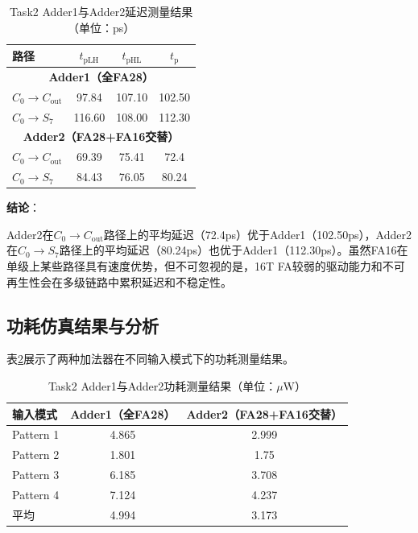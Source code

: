 \documentclass[UTF8,12pt,a4paper]{ctexart}
\begin{document}
\begin{table}[htbp]
    \centering
    \caption{Task2 Adder1与Adder2延迟测量结果（单位：ps）}
    \label{tab:task2_delay}
    \begin{tabular}{lccc}
    \toprule
    路径 & $t_{\text{pLH}}$ & $t_{\text{pHL}}$ & $t_{\text{p}}$ \\
    \midrule
    \multicolumn{4}{c}{\textbf{Adder1（全FA28）}} \\
    \midrule
    $C_0 \rightarrow C_{\text{out}}$ & 97.84 & 107.10 & 102.50 \\
    $C_0 \rightarrow S_7$ & 116.60 & 108.00 & 112.30 \\
    \midrule
    \multicolumn{4}{c}{\textbf{Adder2（FA28+FA16交替）}} \\
    \midrule
    $C_0 \rightarrow C_{\text{out}}$ & 69.39 & 75.41 & 72.4 \\
    $C_0 \rightarrow S_7$ & 84.43 & 76.05 & 80.24 \\
    \bottomrule
    \end{tabular}
\end{table}

\textbf{结论}：

Adder2在$C_0 \rightarrow C_{\text{out}}$路径上的平均延迟（72.4ps）优于Adder1（102.50ps），Adder2在$C_0 \rightarrow S_7$路径上的平均延迟（80.24ps）也优于Adder1（112.30ps）。虽然FA16在单级上某些路径具有速度优势，但不可忽视的是，16T FA较弱的驱动能力和不可再生性会在多级链路中累积延迟和不稳定性。

\subsection{功耗仿真结果与分析}

表\ref{tab:task2_power}展示了两种加法器在不同输入模式下的功耗测量结果。

\begin{table}[htbp]
    \centering
    \caption{Task2 Adder1与Adder2功耗测量结果（单位：$\mu$W）}
    \label{tab:task2_power}
    \begin{tabular}{lcc}
    \toprule
    输入模式 & Adder1（全FA28） & Adder2（FA28+FA16交替） \\
    \midrule
    Pattern 1 & 4.865 & 2.999 \\
    Pattern 2 & 1.801 & 1.75 \\
    Pattern 3 & 6.185 & 3.708 \\
    Pattern 4 & 7.124 & 4.237 \\
    \midrule
    平均 & 4.994 & 3.173 \\
    \bottomrule
    \end{tabular}
\end{table}
\end{document}
